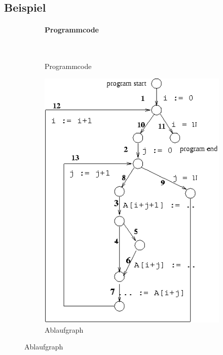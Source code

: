 \subsection{Beispiel}
\begin{figure}[h]
    \begin{subfigure}[c]{.5\linewidth}
        \paragraph{Programmcode}~\\
        \begin{procedure}[H]
        \SetAlgoLined
        \end{procedure}
        \caption{Programmcode}
    \end{subfigure}
    \begin{subfigure}[c]{.5\linewidth}
        \includegraphics[width=\linewidth]{images/cffada.png}
        \caption{Ablaufgraph}
    \end{subfigure}
\end{figure}

